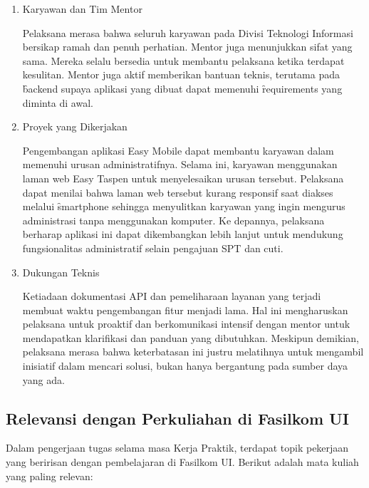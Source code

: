 \begin{enumerate}
    \item Karyawan dan Tim Mentor
    
    Pelaksana merasa bahwa seluruh karyawan pada Divisi Teknologi Informasi
    bersikap ramah dan penuh perhatian. Mentor juga menunjukkan sifat yang sama.
    Mereka selalu bersedia untuk membantu pelaksana ketika terdapat kesulitan.
    Mentor juga aktif memberikan bantuan teknis, terutama pada \f{backend}
    supaya aplikasi yang dibuat dapat memenuhi \f{requirements} yang diminta
    di awal.
    
    \item Proyek yang Dikerjakan
    
    Pengembangan aplikasi Easy Mobile dapat membantu karyawan dalam memenuhi
    urusan administratifnya. Selama ini, karyawan menggunakan laman web Easy
    Taspen untuk menyelesaikan urusan tersebut. Pelaksana dapat menilai bahwa
    laman web tersebut kurang responsif saat diakses melalui \f{smartphone}
    sehingga menyulitkan karyawan yang ingin mengurus administrasi tanpa
    menggunakan komputer. Ke depannya, pelaksana berharap aplikasi ini dapat
    dikembangkan lebih lanjut untuk mendukung fungsionalitas administratif
    selain pengajuan SPT dan cuti.
    
    \item Dukungan Teknis
    
    Ketiadaan dokumentasi API dan pemeliharaan layanan yang terjadi membuat
    waktu pengembangan fitur menjadi lama. Hal ini mengharuskan pelaksana untuk
    proaktif dan berkomunikasi intensif dengan mentor untuk mendapatkan
    klarifikasi dan panduan yang dibutuhkan. Meskipun demikian, pelaksana merasa
    bahwa keterbatasan ini justru melatihnya untuk mengambil inisiatif dalam
    mencari solusi, bukan hanya bergantung pada sumber daya yang ada.
\end{enumerate}

\subsection{Relevansi dengan Perkuliahan di Fasilkom UI}
\label{sec:relevansiPerkuliahan}
Dalam pengerjaan tugas selama masa Kerja Praktik, terdapat topik pekerjaan yang
beririsan dengan pembelajaran di Fasilkom UI. Berikut adalah mata kuliah yang
paling relevan:

